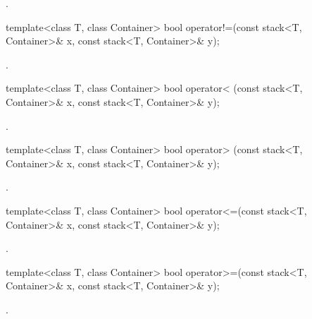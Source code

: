 \begin{itemdescr}
\pnum
\returns
{}.
\end{itemdescr}

%
\begin{itemdecl}
template<class T, class Container>
  bool operator!=(const stack<T, Container>& x, const stack<T, Container>& y);
\end{itemdecl}

\begin{itemdescr}
\pnum
\returns
{}.
\end{itemdescr}

%
\begin{itemdecl}
template<class T, class Container>
  bool operator< (const stack<T, Container>& x, const stack<T, Container>& y);
\end{itemdecl}

\begin{itemdescr}
\pnum
\returns
{}.
\end{itemdescr}

%
\begin{itemdecl}
template<class T, class Container>
  bool operator> (const stack<T, Container>& x, const stack<T, Container>& y);
\end{itemdecl}

\begin{itemdescr}
\pnum
\returns
{}.
\end{itemdescr}

%
\begin{itemdecl}
template<class T, class Container>
  bool operator<=(const stack<T, Container>& x, const stack<T, Container>& y);
\end{itemdecl}

\begin{itemdescr}
\pnum
\returns
{}.
\end{itemdescr}

%
\begin{itemdecl}
template<class T, class Container>
  bool operator>=(const stack<T, Container>& x, const stack<T, Container>& y);
\end{itemdecl}

\begin{itemdescr}
\pnum
\returns
{}.
\end{itemdescr}

